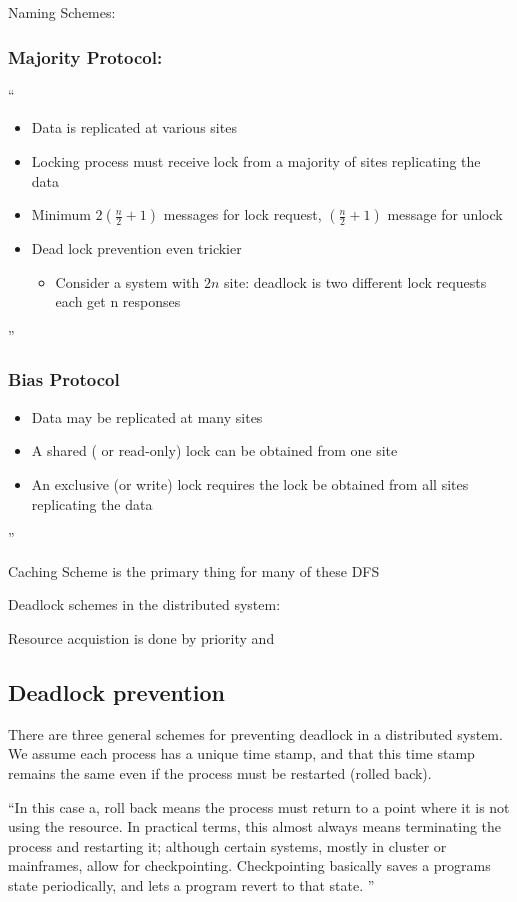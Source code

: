 \documentclass[11pt]{article}
\begin{document}
	Naming Schemes:  
	
\subsubsection{Majority Protocol:}
``
\begin{itemize}
\item Data is replicated at various sites
\item Locking process must receive lock from a majority of sites replicating the data
\item Minimum $2(\frac{n}{2} + 1)$ messages for lock request, $(\frac{n}{2} + 1)$ message for unlock
\item Dead lock prevention even trickier
\begin{itemize}
\item Consider a system with $2n$ site: deadlock is two different lock requests each get n responses
\end{itemize}

\end{itemize}
''
\subsubsection{Bias Protocol}
\begin{itemize}
\item Data may be replicated at many sites 
\item A shared ( or read-only) lock can be obtained from one site
\item An exclusive (or write) lock requires the lock be obtained from all sites replicating the data
\end{itemize}''

Caching Scheme is the primary thing for many of these DFS

Deadlock schemes in the distributed system:  

Resource acquistion is done by priority and 

\subsection{Deadlock prevention}
There are three general schemes for preventing deadlock in a distributed system.  We assume each process has a unique time stamp, and that this time stamp remains the same even if the process must be restarted (rolled back). 

``In this case a, roll back means the process must return to a point where it
is not using the resource. In practical terms, this almost always means
terminating the process and restarting it; although certain systems, mostly
in cluster or mainframes, allow for checkpointing. Checkpointing basically
saves a programs state periodically, and lets a program revert to that
state. ''
\end{document}
